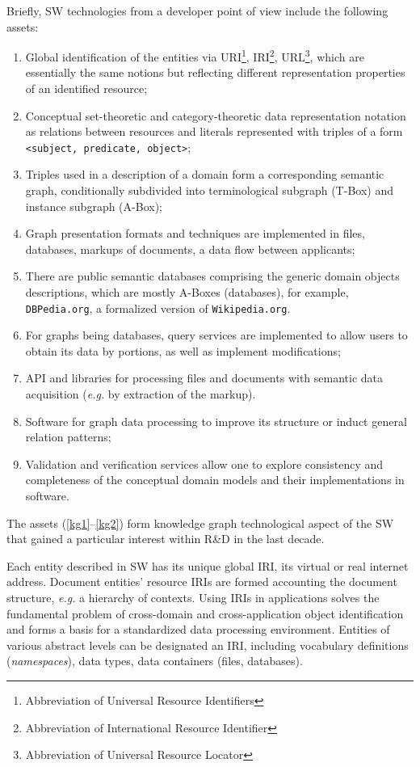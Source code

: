 \documentclass[
]{ceurart}
\begin{document}
Briefly, SW technologies from a developer point of view include the following assets:
\begin{enumerate}
\item Global identification of the entities via URI\footnote{Abbreviation of Universal Resource Identifiers}, IRI\footnote{Abbreviation of International Resource Identifier}, URL\footnote{Abbreviation of Universal Resource Locator}, which are essentially the same notions but reflecting different representation properties of an identified resource;
\item Conceptual set-theoretic and category-theoretic data representation notation as relations between resources and literals represented with triples of a form \texttt{<subject, predicate, object>};
\item Triples used in a description of a domain form a corresponding semantic graph, conditionally subdivided into terminological subgraph (T-Box) and instance subgraph (A-Box);
\item Graph presentation formats and techniques are implemented in files, databases, markups of documents, a data flow between applicants; \label{kg1}
\item There are public semantic databases comprising the generic domain objects descriptions, which are mostly A-Boxes (databases), for example, \texttt{DBPedia.org}, a formalized version of \texttt{Wikipedia.org}. %
\item For graphs being databases, query services are implemented to allow users to obtain its data by portions, as well as implement modifications;
\item API and libraries for processing files and documents with semantic data acquisition (\emph{e.g.} by extraction of the markup).
\item Software for graph data processing to improve its structure or induct general relation patterns;
\item Validation and verification services allow one to explore consistency and completeness of the conceptual domain models and their implementations in software. \label{kg2}
\end{enumerate}
The assets  (\ref{kg1}--\ref{kg2}) form knowledge graph technological aspect of the SW that gained a particular interest within R\&D in the last decade.

Each entity described in SW has its unique global IRI, its virtual or real internet address.  Document entities' resource IRIs are formed accounting the document structure, \emph{e.g.} a hierarchy of contexts.  Using IRIs in applications solves the fundamental problem of cross-domain and cross-application object identification and forms a basis for a standardized data processing environment.  Entities of various abstract levels can be designated an IRI, including vocabulary definitions (\emph{namespaces}), data types, data containers (files, databases).
\end{document}
